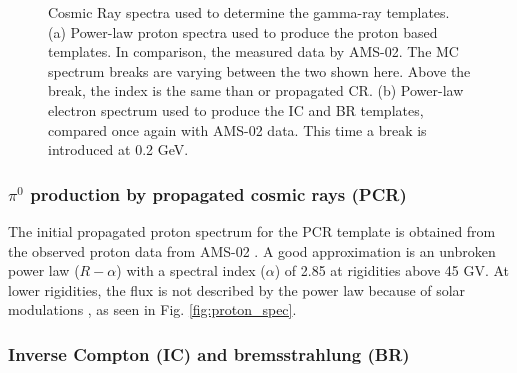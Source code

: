 \begin{figure}[h]
\begin{minipage}[h]{0.45\textwidth}
	  \subcaption{}
	  \label{fig:electron_spec}
  \end{minipage}
  \caption{Cosmic Ray spectra used to determine the gamma-ray templates. (a) Power-law proton spectra used to produce the proton based templates. In comparison, the measured data by AMS-02. The MC spectrum breaks are varying between the two shown here. Above the break, the index is the same than or propagated CR. (b) Power-law electron spectrum used to produce the IC and BR templates, compared once again with AMS-02 data. This time a break is introduced at 0.2 GeV.}
  \label{fig:cosmic_ray_spec}
\end{figure}


\subsubsection{$\pi^0$ production by propagated cosmic rays (PCR)}

The initial propagated proton spectrum for the PCR template is obtained from the observed proton data from AMS-02 . A good approximation is an unbroken power law ($R-\alpha$) with a spectral index ($\alpha$) of 2.85 at rigidities above 45 GV. At lower rigidities, the flux is not described by the power law because of solar modulations , as seen in Fig. \ref{fig:proton_spec}. %



\subsubsection{Inverse Compton (IC) and bremsstrahlung (BR)}

